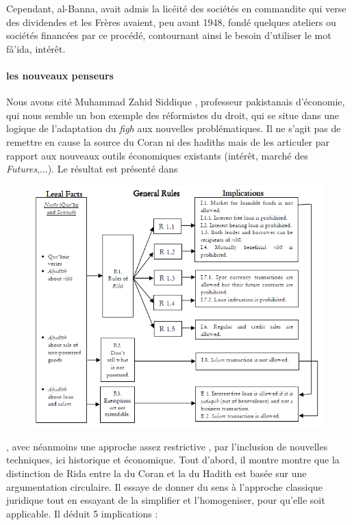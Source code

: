Cependant, al-Banna, avait admis la licéité des sociétés en commandite qui verse des dividendes et les Frères avaient, peu avant 1948, fondé quelques ateliers
ou sociétés financées par ce procédé, contournant ainsi le besoin d'utiliser le mot fâ'ida, intérêt.


\paragraph{les nouveaux penseurs}  Nous avons cité Muhammad Zahid Siddique
\cite{Siddique:DemystifyingRiba}, professeur pakistanais d'économie, qui nous semble un bon exemple des réformistes du droit, qui se situe dans une logique de l'adaptation du \emph{figh} aux nouvelles problématiques. Il ne s'agit pas de remettre en cause la source du Coran ni des hadiths mais de les articuler par rapport aux nouveaux outils économiques existants (intérêt, marché des \textit{Futures},...).
Le résultat est présenté dans

\begin{figure}
    \centering
    \includegraphics{CourantsIslamContemporain/ImagesCourantsIslamContemporain/Ribadistinction.png}
    \label{fig:my_label}
\end{figure}
, avec néanmoins une approche assez restrictive
, par l'inclusion de nouvelles techniques, ici historique et économique. Tout d'abord, il montre montre que la distinction de Rida entre la \riba du Coran et la \riba du Hadith est basée sur une argumentation circulaire. Il essaye de donner du sens à l'approche classique juridique tout en essayant de la simplifier et l'homogeniser, pour qu'elle soit applicable. Il déduit 5 implications : 

